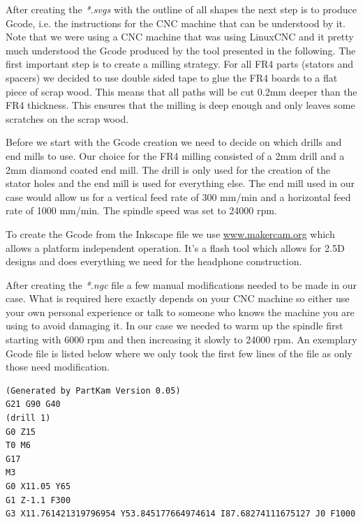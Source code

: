 \documentclass{article}
\begin{document}
After creating the \textit{*.svgs} with the outline of all shapes the next step is to produce Gcode, i.e. the instructions for the CNC machine that can be understood by it. Note that we were using a CNC machine that was using LinuxCNC and it pretty much understood the Gcode produced by the tool presented in the following. The first important step is to create a milling strategy. For all FR4 parts (stators and spacers) we decided to use double sided tape to glue the FR4 boards to a flat piece of scrap wood. This means that all paths will be cut 0.2mm deeper than the FR4 thickness. This ensures that the milling is deep enough and only leaves some scratches on the scrap wood.

Before we start with the Gcode creation we need to decide on which drills and end mills to use. Our choice for the FR4 milling consisted of a 2mm drill and a 2mm diamond coated end mill. The drill is only used for the creation of the stator holes and the end mill is used for everything else. The end mill used in our case would allow us for a vertical feed rate of 300 mm/min and a horizontal feed rate of 1000 mm/min. The spindle speed was set to 24000 rpm.

To create the Gcode from the Inkscape file we use \url{www.makercam.org} which allows a platform independent operation. It's a flash tool which allows for 2.5D designs and does everything we need for the headphone construction.

After creating the \textit{*.ngc} file a few manual modifications needed to be made in our case. What is required here exactly depends on your CNC machine so either use your own personal experience or talk to someone who knows the machine you are using to avoid damaging it. In our case we needed to warm up the spindle first starting with 6000 rpm and then increasing it slowly to 24000 rpm. An exemplary Gcode file is listed below where we only took the first few lines of the file as only those need modification.

\begin{verbatim}
(Generated by PartKam Version 0.05)
G21 G90 G40
(drill 1)
G0 Z15
T0 M6
G17
M3
G0 X11.05 Y65
G1 Z-1.1 F300
G3 X11.761421319796954 Y53.845177664974614 I87.68274111675127 J0 F1000
\end{verbatim}
\end{document}
